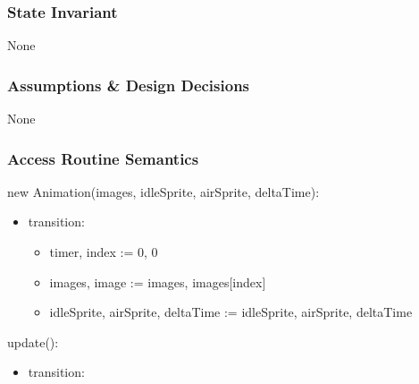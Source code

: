 \documentclass[12pt]{article}
\begin{document}
\subsubsection* {State Invariant}

None

\subsubsection* {Assumptions \& Design Decisions}

None

\subsubsection* {Access Routine Semantics}

new Animation(images, idleSprite, airSprite, deltaTime):
\begin{itemize}
    \item transition: 
    \begin{itemize}[]
        \item timer, index := 0, 0
        \item images, image := images, images[index]
        \item idleSprite, airSprite, deltaTime := idleSprite, airSprite, deltaTime
    \end{itemize}
\end{itemize}

update():
\begin{itemize}
    \item transition:
\end{itemize}
\end{document}
